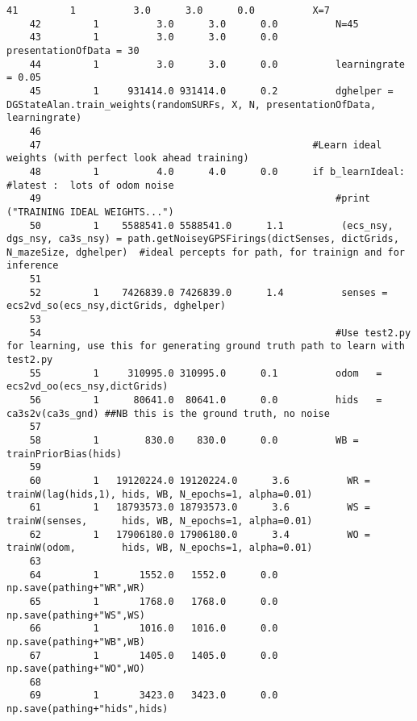 \begin{lstlisting}[xrightmargin=0.05\linewidth,caption=Line by line profiling of the learnWeights\#learn function (boltzmann probs as an eager function), label=profiling:line_learn]
    41         1          3.0      3.0      0.0          X=7
    42         1          3.0      3.0      0.0          N=45
    43         1          3.0      3.0      0.0          presentationOfData = 30
    44         1          3.0      3.0      0.0          learningrate = 0.05
    45         1     931414.0 931414.0      0.2          dghelper = DGStateAlan.train_weights(randomSURFs, X, N, presentationOfData, learningrate)
    46                                           
    47                                               #Learn ideal weights (with perfect look ahead training)
    48         1          4.0      4.0      0.0      if b_learnIdeal: #latest :  lots of odom noise    
    49                                                   #print ("TRAINING IDEAL WEIGHTS...")
    50         1    5588541.0 5588541.0      1.1          (ecs_nsy, dgs_nsy, ca3s_nsy) = path.getNoiseyGPSFirings(dictSenses, dictGrids, N_mazeSize, dghelper)  #ideal percepts for path, for trainign and for inference
    51                                           
    52         1    7426839.0 7426839.0      1.4          senses = ecs2vd_so(ecs_nsy,dictGrids, dghelper) 
    53                                           
    54                                                   #Use test2.py for learning, use this for generating ground truth path to learn with test2.py
    55         1     310995.0 310995.0      0.1          odom   = ecs2vd_oo(ecs_nsy,dictGrids) 
    56         1      80641.0  80641.0      0.0          hids   = ca3s2v(ca3s_gnd) ##NB this is the ground truth, no noise
    57                                           
    58         1        830.0    830.0      0.0          WB = trainPriorBias(hids)
    59                                           
    60         1   19120224.0 19120224.0      3.6          WR = trainW(lag(hids,1), hids, WB, N_epochs=1, alpha=0.01)
    61         1   18793573.0 18793573.0      3.6          WS = trainW(senses,      hids, WB, N_epochs=1, alpha=0.01)
    62         1   17906180.0 17906180.0      3.4          WO = trainW(odom,        hids, WB, N_epochs=1, alpha=0.01)
    63                                           
    64         1       1552.0   1552.0      0.0          np.save(pathing+"WR",WR)
    65         1       1768.0   1768.0      0.0          np.save(pathing+"WS",WS)
    66         1       1016.0   1016.0      0.0          np.save(pathing+"WB",WB)
    67         1       1405.0   1405.0      0.0          np.save(pathing+"WO",WO)
    68                                           
    69         1       3423.0   3423.0      0.0          np.save(pathing+"hids",hids)

\end{lstlisting}
